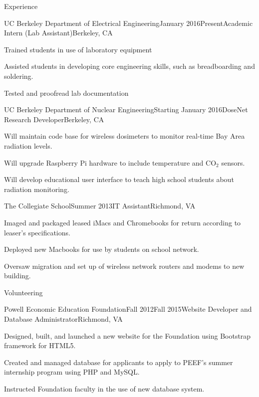 \documentclass{resume} %
\begin{document}
\begin{rSection}{Experience}
\begin{rSubsection}{UC Berkeley Department of Electrical Engineering}{January 2016\textminus Present}{Academic Intern (Lab Assistant)}{Berkeley, CA}
\item Trained students in use of laboratory equipment
\item Assisted students in developing core engineering skills, such as breadboarding and soldering.
\item Tested and proofread lab documentation
\end{rSubsection}
\begin{rSubsection}{UC Berkeley Department of Nuclear Engineering}{Starting January 2016}{DoseNet Research Developer}{Berkeley, CA}
\item Will maintain code base for wireless dosimeters to monitor real-time Bay Area radiation levels.
\item Will upgrade Raspberry Pi hardware to include temperature and CO$_2$ sensors. 
\item Will develop educational user interface to teach high school students about radiation monitoring.
\end{rSubsection}
\begin{rSubsection}{The Collegiate School}{Summer 2013}{IT Assistant}{Richmond, VA}
\item Imaged and packaged leased iMacs and Chromebooks for return according to leaser's specifications.
\item Deployed new Macbooks for use by students on school network.
\item Oversaw migration and set up of wireless network routers and modems to new building.
\end{rSubsection}
\end{rSection}


\begin{rSection}{Volunteering}

\begin{rSubsection}{Powell Economic Education Foundation}{Fall 2012\textminus Fall 2015}{Website Developer and Database Administrator}{Richmond, VA}
\item Designed, built, and launched a new website for the Foundation using Bootstrap framework for HTML5.
\item Created and managed database for applicants to apply to PEEF's summer internship program using PHP and MySQL.
\item Instructed Foundation faculty in the use of new database system.
\end{rSubsection}

\end{rSection}
\end{document}
